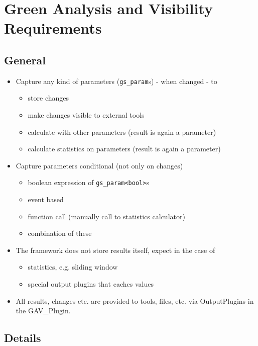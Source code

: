 
\section{Green Analysis and Visibility Requirements}
\label{GAVRequirements}


\subsection{General}

\begin{itemize}
  \item Capture any kind of parameters (\verb|gs_param|s) - when changed - to
  \begin{itemize}
    \item store changes
    \item make changes visible to external tools
    \item calculate with other parameters (result is again a parameter)
    \item calculate statistics on parameters (result is again a parameter)
  \end{itemize}
  \item Capture parameters conditional (not only on changes)
  \begin{itemize}
    \item boolean expression of \verb|gs_param<bool>|s
    \item event based
    \item function call (manually call to statistics calculator)
    \item combination of these
  \end{itemize}

  \item The \GreenAV framework does not store results itself, expect in the case of
  \begin{itemize}
    \item statistics, e.g. sliding window
    \item special output plugins that caches values
  \end{itemize}
  \item All results, changes etc. are provided to tools, files, etc. via OutputPlugins in the GAV\_Plugin.
\end{itemize}

\subsection{Details}


